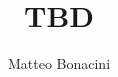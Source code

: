 \documentclass[twocolumn, 10pt]{article}
\begin{document}
\title{TBD}

\author{
Matteo Bonacini%
}


\maketitle

\tableofcontents
\clearpage

\raggedbottom





\newpage

\end{document}
